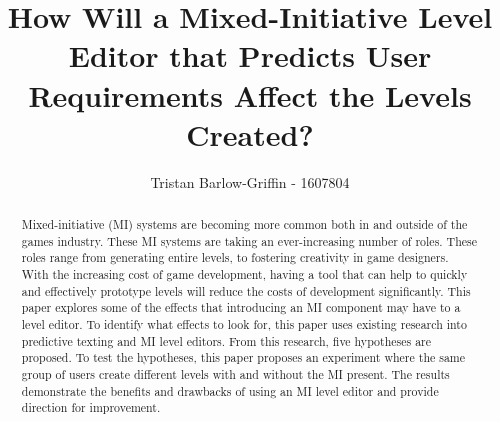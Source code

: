 \documentclass[journal]{IEEEtran}
\begin{document}
%
\title{ How Will a Mixed-Initiative Level Editor that Predicts User Requirements Affect the Levels Created?}
%
%

\author{Tristan Barlow-Griffin - 1607804}


\maketitle

\begin{abstract}
Mixed-initiative (MI) systems are becoming more common both in and outside of the games industry. These MI systems are taking an ever-increasing number of roles. These roles range from generating entire levels, to fostering creativity in game designers. With the increasing cost of game development, having a tool that can help to quickly and effectively prototype levels will reduce the costs of development significantly.
This paper explores some of the effects that introducing an MI component may have to a level editor. To identify what effects to look for, this paper uses existing research into predictive texting and MI level editors. From this research, five hypotheses are proposed. To test the hypotheses, this paper proposes an experiment where the same group of users create different levels with and without the MI present. The results demonstrate the benefits and drawbacks of using an MI level editor and provide direction for improvement.
\end{abstract}
\end{document}

